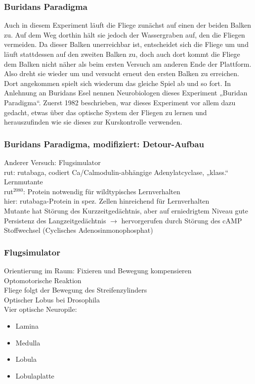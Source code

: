 \subsubsection{Buridans Paradigma}
Auch in diesem Experiment läuft die Fliege zunächst auf einen der beiden Balken zu. Auf dem Weg dorthin hält sie jedoch der Wassergraben auf, den die Fliegen vermeiden. Da dieser Balken unerreichbar ist, entscheidet sich die Fliege um und läuft stattdessen auf den zweiten Balken zu, doch auch dort kommt die Fliege dem Balken nicht näher als beim ersten Versuch am anderen Ende der Plattform. Also dreht sie wieder um und versucht erneut den ersten Balken zu erreichen. Dort angekommen spielt sich wiederum das gleiche Spiel ab und so fort. In Anlehnung an Buridans Esel nennen Neurobiologen dieses Experiment „Buridan Paradigma“. Zuerst 1982 beschrieben, war dieses Experiment vor allem dazu gedacht, etwas über das optische System der Fliegen zu lernen und herauszufinden wie sie dieses zur Kurskontrolle verwenden.

\subsubsection{Buridans Paradigma, modifiziert: Detour-Aufbau}
Anderer Versuch: Flugsimulator\\
rut: rutabaga, codiert Ca/Calmodulin-abhängige Adenylatcyclase, „klass.“ Lernmutante\\
rut$^{2080}$: Protein notwendig für wildtypisches Lernverhalten\\
hier: rutabaga-Protein in spez. Zellen hinreichend für Lernverhalten\\
Mutante hat Störung des Kurzzeitgedächtnis, aber auf erniedrigtem Niveau gute Persistenz des Langzeitgedächtnis $\rightarrow$ hervorgerufen durch Störung des cAMP Stoffwechsel (Cyclisches Adenosinmonophosphat)

\subsubsection{Flugsimulator}
Orientierung im Raum: Fixieren und Bewegung kompensieren\\
Optomotorische Reaktion\\
Fliege folgt der Bewegung des Streifenzylinders\\
Optischer Lobus bei Drosophila\\
Vier optische Neuropile:
\begin{itemize}
	\item Lamina
	\item Medulla
	\item Lobula
	\item Lobulaplatte
\end{itemize}